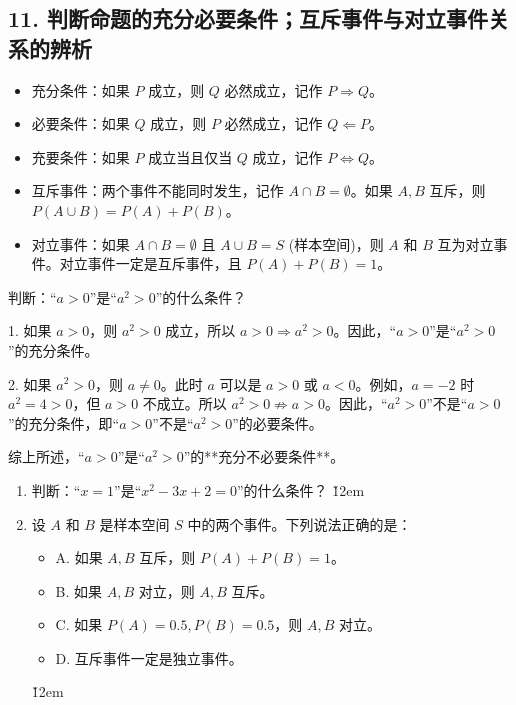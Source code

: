 \subsection*{11. 判断命题的充分必要条件；互斥事件与对立事件关系的辨析}
\begin{theorem}
    \begin{itemize}
        \item 充分条件：如果 $P$ 成立，则 $Q$ 必然成立，记作 $P \Rightarrow Q$。
        \item 必要条件：如果 $Q$ 成立，则 $P$ 必然成立，记作 $Q \Leftarrow P$。
        \item 充要条件：如果 $P$ 成立当且仅当 $Q$ 成立，记作 $P \Leftrightarrow Q$。
        \item 互斥事件：两个事件不能同时发生，记作 $A \cap B = \emptyset$。如果 $A, B$ 互斥，则 $P(A \cup B) = P(A) + P(B)$。
        \item 对立事件：如果 $A \cap B = \emptyset$
              且 $A \cup B = S$ (样本空间)，则 $A$ 和 $B$ 互为对立事件。对立事件一定是互斥事件，且 $P(A) + P(B) = 1$。
    \end{itemize}
\end{theorem}

\begin{example}
    判断：“$a>0$”是“$a^2>0$”的什么条件？
\end{example}
\begin{solution}
    1.  如果 $a>0$，则 $a^2>0$ 成立，所以 $a>0 \Rightarrow a^2>0$。因此，“$a>0$”是“$a^2>0$”的充分条件。

    2.  如果 $a^2>0$，则 $a \ne 0$。此时 $a$ 可以是 $a>0$ 或 $a<0$。例如，$a=-2$ 时 $a^2=4>0$，但 $a>0$ 不成立。所以 $a^2>0 \not\Rightarrow a>0$。因此，“$a^2>0$”不是“$a>0$”的充分条件，即“$a>0$”不是“$a^2>0$”的必要条件。

    综上所述，“$a>0$”是“$a^2>0$”的**充分不必要条件**。
\end{solution}

\begin{problem}
\begin{enumerate}
    \item 判断：“$x=1$”是“$x^2-3x+2=0$”的什么条件？
          \v{12em}
    \item 设 $A$ 和 $B$ 是样本空间 $S$ 中的两个事件。下列说法正确的是：
          \begin{itemize}
              \item A. 如果 $A, B$ 互斥，则 $P(A)+P(B)=1$。
              \item B. 如果 $A, B$ 对立，则 $A, B$ 互斥。
              \item C. 如果 $P(A)=0.5, P(B)=0.5$，则 $A, B$ 对立。
              \item D. 互斥事件一定是独立事件。
          \end{itemize}
          \v{12em}
\end{enumerate}

\end{problem}

